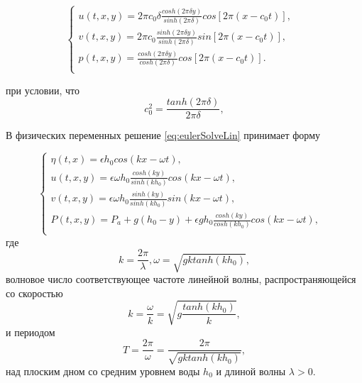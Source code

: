 \begin{equation}\label{eq:eulerSolveLin}
    \begin{cases}
         u(t,x,y)=2\pi c_0\delta \frac{cosh(2\pi\delta y)}{sinh(2\pi\delta)} cos[2\pi(x-c_0t)], & \\
         v(t,x,y)=2\pi c_0 \frac{sinh(2\pi\delta y)}{sinh(2\pi\delta)} sin[2\pi(x-c_0t)], & \\
         p(t,x,y)=\frac{cosh(2\pi\delta y)}{cosh(2\pi\delta)} cos[2\pi(x-c_0t)]. & \\
    \end{cases}
  \end{equation}

 при условии, что
 \begin{equation}\label{eq:speedLin}
   c_0^2=\frac{tanh(2\pi\delta)}{2\pi\delta},
 \end{equation}

 В физических переменных решение \eqref{eq:eulerSolveLin} принимает форму

\begin{equation}\label{eq:eulerSolveLinPhys}
    \begin{cases}
         \eta(t,x)=\epsilon h_0cos(kx-\omega t), & \\
         u(t,x,y)=\epsilon\omega h_0 \frac{cosh(ky)}{sinh(kh_0)} cos(kx-\omega t), & \\
         v(t,x,y)=\epsilon\omega h_0 \frac{sinh(ky)}{sinh(kh_0)} sin(kx-\omega t), & \\
         P(t,x,y)=P_a+g(h_0-y)+\epsilon gh_0\frac{cosh(ky)}{cosh(kh_0)} cos(kx-\omega t), & \\
    \end{cases}
  \end{equation}
где
\begin{equation}\label{eq:dispRelationLin}
  k=\frac{2\pi}{\lambda}, \omega=\sqrt{gk tanh(kh_0)},
\end{equation}
волновое число соответствующее частоте линейной волны, распространяющейся со скоростью
\begin{equation}\label{eq:speedLin_k}
  k=\frac{\omega}{k}=\sqrt{g\frac{tanh(kh_0)}{k}},
\end{equation}
и периодом
\begin{equation}\label{eq:periodLin_k}
  T=\frac{2\pi}{\omega}=\frac{2\pi}{\sqrt{gk tanh(kh_0)}},
\end{equation}
над плоским дном со средним уровнем воды $h_0$ и длиной волны $\lambda>0$.

